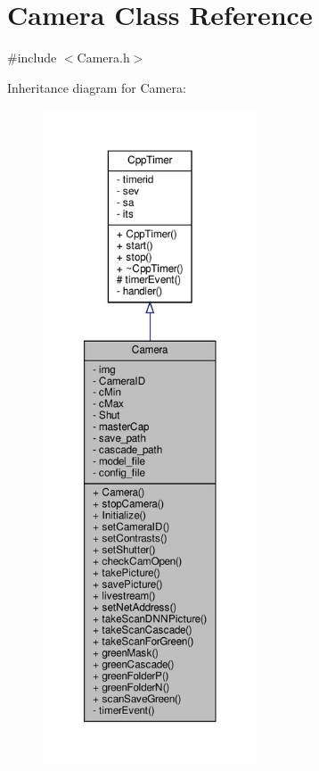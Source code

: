 \hypertarget{classCamera}{}\section{Camera Class Reference}
\label{classCamera}


{\ttfamily \#include $<$Camera.\+h$>$}



Inheritance diagram for Camera\+:\nopagebreak
\begin{figure}[H]
\begin{center}
\leavevmode
\includegraphics[height=550pt]{classCamera__inherit__graph}
\end{center}
\end{figure}


